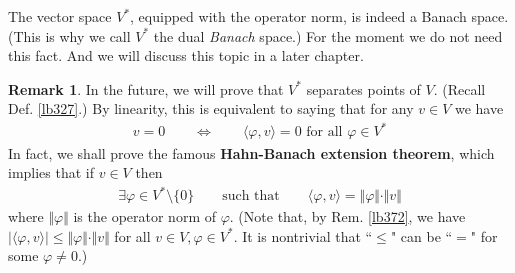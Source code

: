 \documentclass[12pt,b5paper,notitlepage]{article}
\theoremstyle{definition}
\newtheorem{rem}[df]{Remark}
\theoremstyle{plain}
\newcommand{\fk}{\mathfrak}
\newcommand{\ovl}{\overline}
\newcommand{\bk}[1]{\langle {#1}\rangle}
\numberwithin{equation}{section}
\begin{document}
The vector space $V^*$, equipped with the operator norm, is indeed a Banach space. (This is why we call $V^*$ the dual \textit{Banach} space.) For the moment we do not need this fact. And we will discuss this topic in a later chapter.



\begin{rem}\label{lb393}
In the future, we will prove that $V^*$ separates points of $V$. (Recall Def. \ref{lb327}.) By linearity, this is equivalent to saying that for any $v\in V$ we have
\begin{align}\label{eq115}
v=0\qquad\Longleftrightarrow\qquad\bk{\varphi,v}=0\text{ for all }\varphi\in V^*
\end{align}
In fact, we shall prove the famous \textbf{Hahn-Banach extension theorem}, which implies that if $v\in V$ then
\begin{align}
\exists \varphi\in V^*\setminus\{0\}\qquad\text{such that}\qquad\bk{\varphi,v}=\Vert\varphi\Vert\cdot\Vert v\Vert \label{eq116}
\end{align}
where $\Vert\varphi\Vert$ is the operator norm of $\varphi$. (Note that, by Rem. \ref{lb372}, we have $|\bk{\varphi,v}|\leq\Vert\varphi\Vert\cdot\Vert v\Vert$ for all $v\in V,\varphi\in V^*$. It is nontrivial that ``$\leq$" can be ``$=$" for some $\varphi\neq0$.)
\end{rem}




\begin{comment}
From \eqref{eq118}, it is clear that for any $v\in V,\varphi\in V^*$ we have
\begin{align}
|\bk{\varphi,v}|\leq\Vert\varphi\Vert\cdot\Vert v\Vert \label{eq119}
\end{align}
Thus, the inequality ``$\geq$" trivially holds in \eqref{eq116}. The ``$\leq$" in \eqref{eq116} is nontrivial. 

\begin{rem}\label{lb328}
If we equip the \textbf{double dual space} \index{00@Double dual space $V^{**}$} $V^{**}=(V^*)^*$ \index{V@$V^{**}=(V^*)^*$} with the operator norm, then for each $\fk v\in V^{**}$, by \eqref{eq120} we have
\begin{align*}
\Vert\fk v\Vert=\sup_{\varphi\in \ovl B_{V^*}(0,1)}|\bk{\fk v,\varphi}|
\end{align*}
From this relation, it is clear that \eqref{eq116} holds if and only if the canonical linear map 
\begin{gather}
V\rightarrow V^{**}\qquad v\mapsto \bk{\cdot ,v}  \label{eq117}
\end{gather} 
(where $\bk{\cdot,v}$ sends each $\varphi\in V^*$ to $\bk{\varphi,v}=\varphi(v)$) is an isometry.
\end{rem}

\end{comment}
\end{document}
